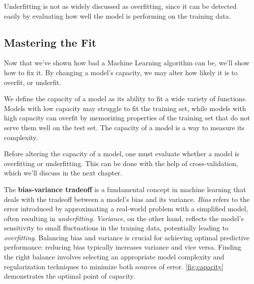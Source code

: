 \documentclass{article}
\begin{document}
  Underfitting is not as widely discussed as overfitting, since it can be detected easily by evaluating how well the model is performing on the training data. 

 \subsection{Mastering the Fit}%
  \label{sub:Mastering the Fit}
  Now that we've shown how bad a Machine Learning algorithm can be, we'll show how to fix it. By changing a model's capacity, we may alter how likely it is to overfit, or underfit. 
  \begin{definition}[Capacity]
   We define the capacity of a model as its ability to fit a wide variety of
functions. Models with low capacity may struggle to fit the training set, while models
with high capacity can overfit by memorizing properties of the training set that do
not serve them well on the test set. The capacity of a model is a way to measure its complexity.
  \end{definition}

  Before altering the capacity of a model, one must evaluate whether a model is overfitting or underfitting. This can be done with the help of cross-validation, which we'll discuss in the next chapter. 

The \textbf{bias-variance tradeoff} is a fundamental concept in machine learning that deals with the tradeoff between a model's bias and its variance. \textit{Bias} refers to the error introduced by approximating a real-world problem with a simplified model, often resulting in \textit{underfitting}. \textit{Variance}, on the other hand, reflects the model's sensitivity to small fluctuations in the training data, potentially leading to \textit{overfitting}. Balancing bias and variance is crucial for achieving optimal predictive performance: reducing bias typically increases variance and vice versa. Finding the right balance involves selecting an appropriate model complexity and regularization techniques to minimize both sources of error. \autoref{fig:capacity} demonstrates the optimal point of capacity. 
\end{document}
